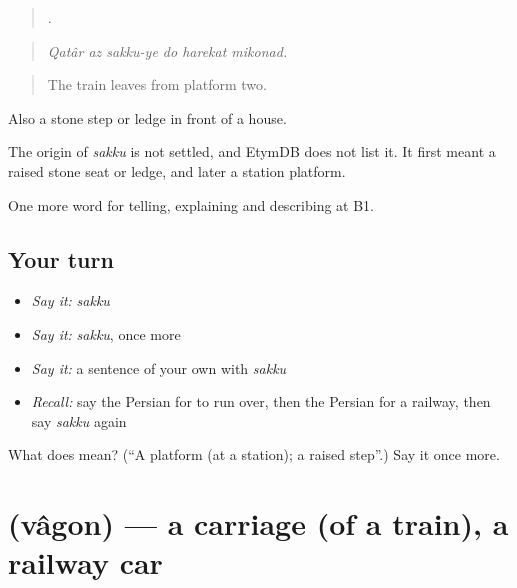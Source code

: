 \begin{quote}
     .
\end{quote}

\begin{quote}
\emph{Qatâr az sakku-ye do harekat mikonad.}
\end{quote}

\begin{quote}
The train leaves from platform two.
\end{quote}

Also a stone step or ledge in front of a house.

\begin{cousinweb}
The origin of \emph{sakku} is not settled, and EtymDB does not list it. It first meant a raised stone seat or ledge, and later a station platform.
\end{cousinweb}

\begin{grammarlens}[title={What you've built}]
One more word for telling, explaining and describing at B1.
\end{grammarlens}

\subsection*{Your turn}
\begin{itemize}
\raggedright
  \item \emph{Say it:} \emph{sakku}
  \item \emph{Say it:} \emph{sakku}, once more
  \item \emph{Say it:} a sentence of your own with \emph{sakku}
  \item \emph{Recall:} say the Persian for to run over, then the Persian for a railway, then say \emph{sakku} again
\end{itemize}

\begin{tcolorbox}[breakable,colback=teal!4,colframe=teal!35!black,title={Before you move on}]
What does  mean? (\textquotedblleft{}A platform (at a station); a raised step\textquotedblright{}.) Say it once more.
\end{tcolorbox}
\section[\texorpdfstring{\fa{واگن} (vâgon)}{واگن (vâgon)}]{ (vâgon) — a carriage (of a train), a railway car}

